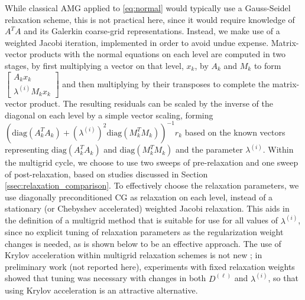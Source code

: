 While classical AMG applied to \eqref{eq:normal} would typically use a
Gauss-Seidel relaxation scheme, this is not practical here, since it
would require knowledge of $A^TA$ and its Galerkin coarse-grid
representations.  Instead, we make use of a weighted Jacobi iteration,
implemented in order to avoid undue expense.  Matrix-vector products
with the normal equations on each level are computed in two stages, by
first multiplying a vector on that level, $x_k$, by $A_k$ and $M_k$ to
form $\left[\begin{smallmatrix}
A_kx_k \\ \lambda^{(i)}M_kx_k \end{smallmatrix}\right]$ and then
multiplying by their transposes to complete the matrix-vector product.
The resulting residuals can be scaled by the inverse of the diagonal
on each level by a simple vector scaling, forming
$\left(\text{diag}(A_k^TA_k)
+ \left(\lambda^{(i)}\right)^2\text{diag}(M_k^TM_k)\right)^{-1}r_k$
based on the known vectors representing $\text{diag}(A_k^TA_k)$ and
$\text{diag}(M_k^TM_k)$ and the parameter $\lambda^{(i)}$.  Within the
multigrid cycle, we choose to use two sweeps of pre-relaxation and
one sweep of post-relaxation, based on studies discussed in Section \ref{ssec:relaxation_comparison}.  To effectively choose the relaxation
parameters, we use diagonally preconditioned CG as relaxation on each
level, instead of a stationary (or Chebyshev accelerated) weighted
Jacobi relaxation.  This aids in the definition of a multigrid method
that is suitable for use for all values of $\lambda^{(i)}$, since no
explicit tuning of relaxation parameters as the regularization weight
changes is needed, as is shown below to be an effective approach.  The
use of Krylov acceleration within multigrid relaxation schemes is not
new \cite{REBank_CCDouglas_1985a, BReps_etal_2010a}; in preliminary
work (not reported here), experiments with fixed relaxation weights
showed that tuning was necessary with changes in both $D^{(\ell)}$ and
$\lambda^{(i)}$, so that using Krylov acceleration is an attractive
alternative.


